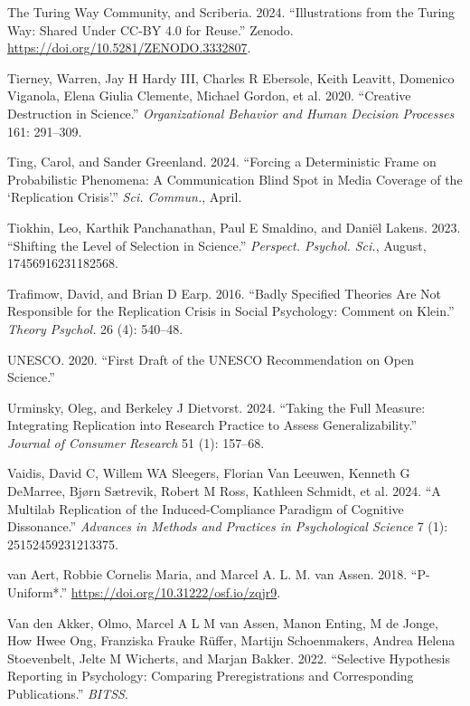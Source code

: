 \documentclass[
  letterpaper,
  DIV=11,
  numbers=noendperiod]{scrreprt}
\newlength{\cslhangindent}
\newenvironment{CSLReferences}[2] %
 {\begin{list}{}{%
  \setlength{\itemindent}{0pt}
  \setlength{\leftmargin}{0pt}
  \setlength{\parsep}{0pt}
  \ifodd #1
   \setlength{\leftmargin}{\cslhangindent}
   \setlength{\itemindent}{-1\cslhangindent}
  \fi
  \setlength{\itemsep}{#2\baselineskip}}}
 {\end{list}}
\begin{document}
\begin{CSLReferences}{1}{0}
The Turing Way Community, and Scriberia. 2024. {``Illustrations from the
Turing Way: Shared Under CC-BY 4.0 for Reuse.''} Zenodo.
\url{https://doi.org/10.5281/ZENODO.3332807}.

Tierney, Warren, Jay H Hardy III, Charles R Ebersole, Keith Leavitt,
Domenico Viganola, Elena Giulia Clemente, Michael Gordon, et al. 2020.
{``Creative Destruction in Science.''} \emph{Organizational Behavior and
Human Decision Processes} 161: 291--309.

Ting, Carol, and Sander Greenland. 2024. {``Forcing a Deterministic
Frame on Probabilistic Phenomena: A Communication Blind Spot in Media
Coverage of the {`Replication Crisis'}.''} \emph{Sci. Commun.}, April.

Tiokhin, Leo, Karthik Panchanathan, Paul E Smaldino, and Daniël Lakens.
2023. {``Shifting the Level of Selection in Science.''} \emph{Perspect.
Psychol. Sci.}, August, 17456916231182568.

Trafimow, David, and Brian D Earp. 2016. {``Badly Specified Theories Are
Not Responsible for the Replication Crisis in Social Psychology: Comment
on Klein.''} \emph{Theory Psychol.} 26 (4): 540--48.

UNESCO. 2020. {``First Draft of the UNESCO Recommendation on Open
Science.''}

Urminsky, Oleg, and Berkeley J Dietvorst. 2024. {``Taking the Full
Measure: Integrating Replication into Research Practice to Assess
Generalizability.''} \emph{Journal of Consumer Research} 51 (1):
157--68.

Vaidis, David C, Willem WA Sleegers, Florian Van Leeuwen, Kenneth G
DeMarree, Bjørn Sætrevik, Robert M Ross, Kathleen Schmidt, et al. 2024.
{``A Multilab Replication of the Induced-Compliance Paradigm of
Cognitive Dissonance.''} \emph{Advances in Methods and Practices in
Psychological Science} 7 (1): 25152459231213375.

van Aert, Robbie Cornelis Maria, and Marcel A. L. M. van Assen. 2018.
{``P-Uniform*.''} \url{https://doi.org/10.31222/osf.io/zqjr9}.

Van den Akker, Olmo, Marcel A L M van Assen, Manon Enting, M de Jonge,
How Hwee Ong, Franziska Frauke Rüffer, Martijn Schoenmakers, Andrea
Helena Stoevenbelt, Jelte M Wicherts, and Marjan Bakker. 2022.
{``Selective Hypothesis Reporting in Psychology: Comparing
Preregistrations and Corresponding Publications.''} \emph{BITSS}.


\end{CSLReferences}
\end{document}
